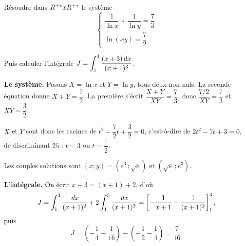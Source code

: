 \begin{concours}
Résoudre dans $R^{+*} x R^{+*}$ le système
\[
  \begin{cases}
    \dfrac{1}{\ln x} + \dfrac{1}{\ln y} = \dfrac{7}{3} \\[0.8em]
    \ln(xy) = \dfrac{7}{2}
  \end{cases}
\]

Puis calculer l'intégrale $\displaystyle J = \int_{1}^{3} \frac{(x+3)\,dx}{(x+1)^{3}}$.
\end{concours}

\begin{corrige}
\textbf{Le système.} Posons $X = \ln x$ et $Y = \ln y$, tous deux non nuls. La
seconde équation donne $X+Y = \dfrac{7}{2}$. La première s'écrit
$\dfrac{X+Y}{XY} = \dfrac{7}{3}$, donc
$\dfrac{7/2}{XY} = \dfrac{7}{3}$ et $XY = \dfrac{3}{2}$.

$X$ et $Y$ sont donc les racines de $t^{2}-\dfrac72 t + \dfrac32 = 0$,
c'est-à-dire de $2t^{2}-7t+3 = 0$, de discriminant $25$ : $t = 3$ ou
$t = \dfrac12$.

Les couples solutions sont $(x;y) = \left(e^{3}\,;\sqrt{e}\right)$ et
$\left(\sqrt{e}\,;e^{3}\right)$.

\smallskip
\textbf{L'intégrale.} On écrit $x+3 = (x+1)+2$, d'où
\[
  J = \int_{1}^{3}\frac{\,dx}{(x+1)^{2}} + 2\int_{1}^{3}\frac{\,dx}{(x+1)^{3}}
    = \left[-\frac{1}{x+1}-\frac{1}{(x+1)^{2}}\right]_{1}^{3},
\]
puis
\[
  J = \left(-\frac14-\frac1{16}\right)-\left(-\frac12-\frac14\right)
    = \frac{7}{16}.
\]
\end{corrige}


